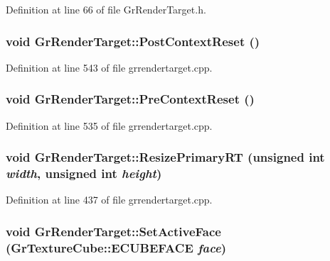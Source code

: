 \begin{CompactItemize}
Definition at line 66 of file GrRenderTarget.h.\hypertarget{class_gr_render_target_9f94b394daefa8da7daeb3e089ca61ee}{
\subsubsection[{PostContextReset}]{\setlength{\rightskip}{0pt plus 5cm}void GrRenderTarget::PostContextReset ()}}
\label{class_gr_render_target_9f94b394daefa8da7daeb3e089ca61ee}




Definition at line 543 of file grrendertarget.cpp.\hypertarget{class_gr_render_target_5eaf686fa2fe311e716c4e3b8e97f5ed}{
\subsubsection[{PreContextReset}]{\setlength{\rightskip}{0pt plus 5cm}void GrRenderTarget::PreContextReset ()}}
\label{class_gr_render_target_5eaf686fa2fe311e716c4e3b8e97f5ed}




Definition at line 535 of file grrendertarget.cpp.\hypertarget{class_gr_render_target_8b9ab6e93c0037d2d594dbd0249e56cf}{
\subsubsection[{ResizePrimaryRT}]{\setlength{\rightskip}{0pt plus 5cm}void GrRenderTarget::ResizePrimaryRT (unsigned int {\em width}, \/  unsigned int {\em height})}}
\label{class_gr_render_target_8b9ab6e93c0037d2d594dbd0249e56cf}




Definition at line 437 of file grrendertarget.cpp.\hypertarget{class_gr_render_target_fbe2a4a66992e0a5b969b5e464bd120d}{
\subsubsection[{SetActiveFace}]{\setlength{\rightskip}{0pt plus 5cm}void GrRenderTarget::SetActiveFace ({\bf GrTextureCube::ECUBEFACE} {\em face})}}
\label{class_gr_render_target_fbe2a4a66992e0a5b969b5e464bd120d}





\end{CompactItemize}
